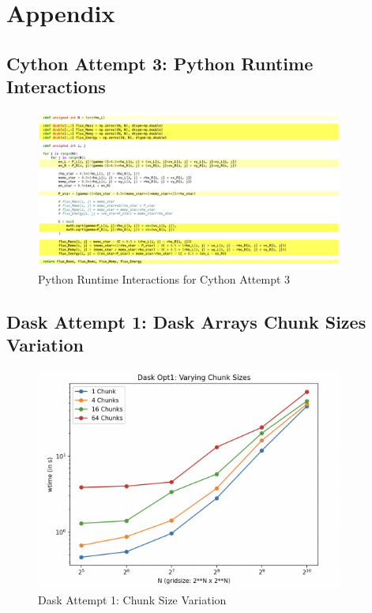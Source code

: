 \documentclass[a4paper,10pt]{article}
\begin{document}
\newpage
\section{Appendix}
\subsection{Cython Attempt 3: Python Runtime Interactions}
\begin{figure}[H]
  \centering
  \includegraphics[width=0.9\textwidth]{images/misc/cython_attempt_3_annotated.png}
  \caption{Python Runtime Interactions for Cython Attempt 3}
  \label{fig:cython_attempt_3_annotated}
\end{figure}

\subsection{Dask Attempt 1: Dask Arrays Chunk Sizes Variation}
\begin{figure}[H]
  \centering
  \includegraphics[width=0.9\textwidth]{images/dask/dask_opt1_chunk_size.png}
  \caption{Dask Attempt 1: Chunk Size Variation}
  \label{fig:dask_opt1_chunk_size}
\end{figure}
\end{document}
